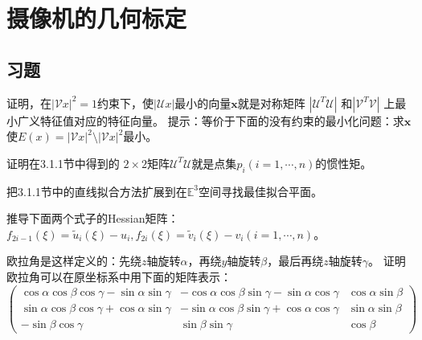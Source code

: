 
\section{摄像机的几何标定}

\subsection{习题}

\begin{problem}
    证明，在$\left | \mathcal{V} x  \right | ^2=1$约束下，使$\left | \mathcal{U} x  \right | $最小的向量$\mathbf{x}$就是对称矩阵
    $\left | \mathcal{U}^T \mathcal{U}  \right | $ 和$\left | \mathcal{V}^T \mathcal{V}  \right | $ 上最小广义特征值对应的特征向量。
    提示：等价于下面的没有约束的最小化问题：求$\mathbf{x}$使$E(x)=\left | \mathcal{V} x  \right |^2 \setminus \left | \mathcal{V} x  \right |^2 $最小。
\end{problem}

\begin{problem}
    证明在3.1.1节中得到的 $2 \times 2$矩阵$\mathcal{U}^T \mathcal{U} $就是点集$p_i(i=1, \cdots , n)$的惯性矩。
\end{problem}

\begin{problem}
    把3.1.1节中的直线拟合方法扩展到在$\mathbb{E}^3$空间寻找最佳拟合平面。
\end{problem}

\begin{problem}
    推导下面两个式子的Hessian矩阵：$f_{2i-1}(\xi)=\tilde{u}_i (\xi) -u_i, f_{2i}(\xi)=\tilde{v}_i (\xi) -v_i(i=1,\cdots , n) $。
\end{problem}

\begin{problem}
    欧拉角是这样定义的：先绕$z$轴旋转$\alpha$，再绕$y$轴旋转$\beta$，最后再绕$z$轴旋转$\gamma$。
    证明欧拉角可以在原坐标系中用下面的矩阵表示：
    $$
    \begin{pmatrix}
        \cos \alpha \cos \beta \cos \gamma -\sin \alpha \sin \gamma  & -\cos \alpha \cos \beta \sin \gamma -\sin \alpha \cos \gamma & \cos \alpha \sin \beta\\
        \sin \alpha \cos \beta \cos \gamma +\cos \alpha \sin \gamma  & -\sin \alpha \cos \beta \sin \gamma +\cos \alpha \cos \gamma & \sin \alpha \sin \beta\\
        -\sin \beta \cos \gamma                                      & \sin \beta \sin \gamma                                       & \cos \beta 
    \end{pmatrix}
    $$
\end{problem}


